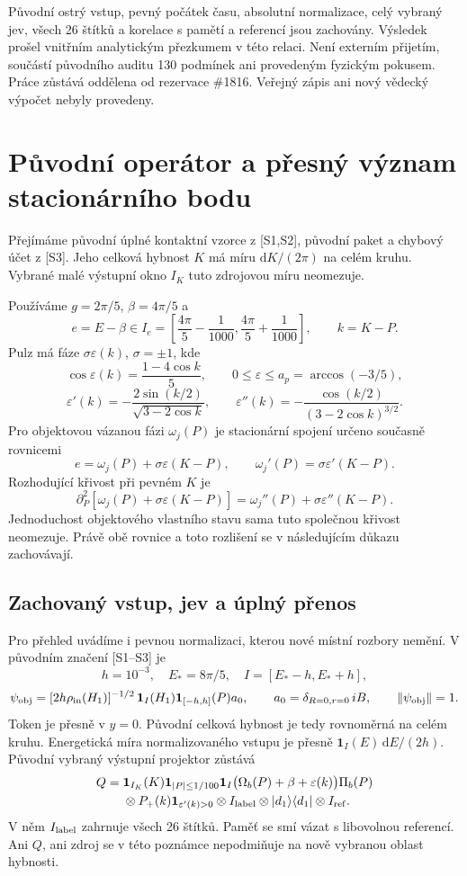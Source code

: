 \documentclass[11pt,a4paper]{article}
\theoremstyle{remark}\newtheorem{remark}[theorem]{Poznámka}
\numberwithin{equation}{section}
\begin{document}
\vfill
\small
Původní ostrý vstup, pevný počátek času, absolutní normalizace, celý vybraný jev, všech 26 štítků a korelace s pamětí a referencí jsou zachovány. Výsledek prošel vnitřním analytickým přezkumem v této relaci. Není externím přijetím, součástí původního auditu 130 podmínek ani provedeným fyzickým pokusem. Práce zůstává oddělena od rezervace \#1816. Veřejný zápis ani nový vědecký výpočet nebyly provedeny.
\newpage
\normalsize

\section{Původní operátor a přesný význam stacionárního bodu}

Přejímáme původní úplné kontaktní vzorce z [S1,S2], původní paket a chybový účet z [S3]. Jeho celková hybnost \(K\) má míru \(\mathrm dK/(2\pi)\) na celém kruhu. Vybrané malé výstupní okno \(I_K\) tuto zdrojovou míru neomezuje.

Používáme \(g=2\pi/5\), \(\beta=4\pi/5\) a
\[
e=E-\beta\in I_e=
\left[\frac{4\pi}{5}-\frac1{1000},\frac{4\pi}{5}+\frac1{1000}\right],
\qquad k=K-P.
\]
Pulz má fáze \(\sigma\varepsilon(k)\), \(\sigma=\pm1\), kde
\[
\cos\varepsilon(k)=\frac{1-4\cos k}{5},\qquad
0\le\varepsilon\le a_p=\arccos(-3/5),
\]
\[
\varepsilon'(k)=-\frac{2\sin(k/2)}{\sqrt{3-2\cos k}},\qquad
\varepsilon''(k)=-\frac{\cos(k/2)}{(3-2\cos k)^{3/2}}.
\]
Pro objektovou vázanou fázi \(\omega_j(P)\) je stacionární spojení určeno současně rovnicemi
\[
e=\omega_j(P)+\sigma\varepsilon(K-P),\qquad
\omega_j'(P)=\sigma\varepsilon'(K-P).
\]
Rozhodující křivost při pevném \(K\) je
\[
\partial_P^2[\omega_j(P)+\sigma\varepsilon(K-P)]
=\omega_j''(P)+\sigma\varepsilon''(K-P).
\]
Jednoduchost objektového vlastního stavu sama tuto společnou křivost neomezuje. Právě obě rovnice a toto rozlišení se v následujícím důkazu zachovávají.



\subsection{Zachovaný vstup, jev a úplný přenos}

Pro přehled uvádíme i pevnou normalizaci, kterou nové místní
rozbory nemění. V původním značení [S1--S3] je
\[
h=10^{-3},\quad E_*=8\pi/5,\quad I=[E_*-h,E_*+h],
\]
\[
\psi_{\rm obj}
=[2h\rho_{\rm in}(H_1)]^{-1/2}\,
\mathbf1_I(H_1)\mathbf1_{[-h,h]}(P)a_0,\qquad
a_0=\delta_{R=0,r=0}\,iB,\qquad
\|\psi_{\rm obj}\|=1.
\]
Token je přesně v \(y=0\). Původní celková hybnost je tedy
rovnoměrná na celém kruhu. Energetická míra normalizovaného
vstupu je přesně \(\mathbf1_I(E)\,\mathrm dE/(2h)\).
Původní vybraný výstupní projektor zůstává
\[
\begin{aligned}
Q={}&\mathbf1_{I_K}(K)\mathbf1_{|P|\le1/100}
\mathbf1_I\bigl(\Omega_b(P)+\beta+\varepsilon(k)\bigr)\Pi_b(P)\\
&\otimes P_+(k)\mathbf1_{\varepsilon'(k)>0}
\otimes I_{\rm label}\otimes|d_1\rangle\langle d_1|
\otimes I_{\rm ref}.
\end{aligned}
\]
V něm \(I_{\rm label}\) zahrnuje všech 26 štítků. Paměť se
smí vázat s libovolnou referencí. Ani \(Q\), ani zdroj se v této
poznámce nepodmiňuje na nově vybranou oblast hybnosti.
\end{document}
